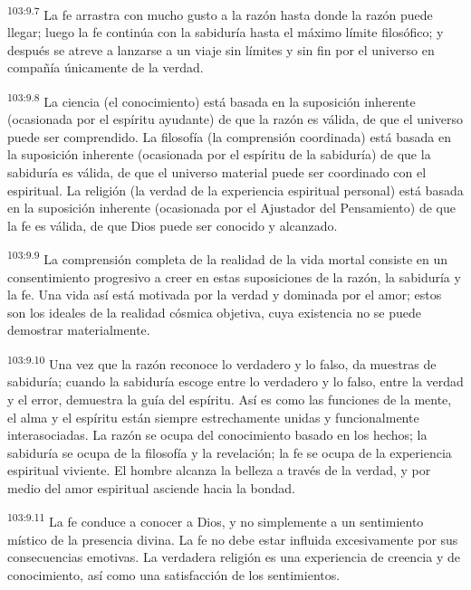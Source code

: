 \par
\textsuperscript{103:9.7} La fe arrastra con mucho gusto a la razón hasta donde la razón puede llegar; luego la fe continúa con la sabiduría hasta el máximo límite filosófico; y después se atreve a lanzarse a un viaje sin límites y sin fin por el universo en compañía únicamente de la verdad.

\par
\textsuperscript{103:9.8} La ciencia (el conocimiento) está basada en la suposición inherente (ocasionada por el espíritu ayudante) de que la razón es válida, de que el universo puede ser comprendido. La filosofía (la comprensión coordinada) está basada en la suposición inherente (ocasionada por el espíritu de la sabiduría) de que la sabiduría es válida, de que el universo material puede ser coordinado con el espiritual. La religión (la verdad de la experiencia espiritual personal) está basada en la suposición inherente (ocasionada por el Ajustador del Pensamiento) de que la fe es válida, de que Dios puede ser conocido y alcanzado.

\par
\textsuperscript{103:9.9} La comprensión completa de la realidad de la vida mortal consiste en un consentimiento progresivo a creer en estas suposiciones de la razón, la sabiduría y la fe. Una vida así está motivada por la verdad y dominada por el amor; estos son los ideales de la realidad cósmica objetiva, cuya existencia no se puede demostrar materialmente.

\par
\textsuperscript{103:9.10} Una vez que la razón reconoce lo verdadero y lo falso, da muestras de sabiduría; cuando la sabiduría escoge entre lo verdadero y lo falso, entre la verdad y el error, demuestra la guía del espíritu. Así es como las funciones de la mente, el alma y el espíritu están siempre estrechamente unidas y funcionalmente interasociadas. La razón se ocupa del conocimiento basado en los hechos; la sabiduría se ocupa de la filosofía y la revelación; la fe se ocupa de la experiencia espiritual viviente. El hombre alcanza la belleza a través de la verdad, y por medio del amor espiritual asciende hacia la bondad.

\par
\textsuperscript{103:9.11} La fe conduce a conocer a Dios, y no simplemente a un sentimiento místico de la presencia divina. La fe no debe estar influida excesivamente por sus consecuencias emotivas. La verdadera religión es una experiencia de creencia y de conocimiento, así como una satisfacción de los sentimientos.


